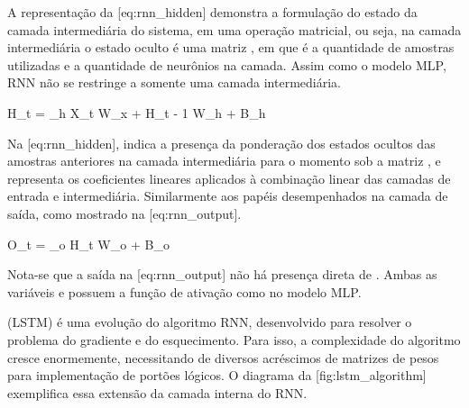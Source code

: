 			\startplacefigure[title={Demonstração da unidade fundamental das redes neurais recorrentes}, reference={fig:rnn_algorithm}]
			\stopplacefigure
		\stophead

		A representação da [eq:rnn_hidden] demonstra a formulação do estado da camada intermediária do sistema, em uma operação matricial, ou seja, na camada intermediária o estado oculto é uma matriz , em que  é a quantidade de amostras utilizadas e  a quantidade de neurônios na camada. Assim como o modelo MLP, RNN não se restringe a somente uma camada intermediária.

		\startplaceformula[reference={eq:rnn_hidden}]
			\startformula
				H_{t} = \sigma_{h} \left\lparen X_{t} W_{x} + H_{t - 1} W_{h} + B_{h} \right\rparen
			\stopformula
		\stopplaceformula

		Na [eq:rnn_hidden],  indica a presença da ponderação dos estados ocultos das amostras anteriores na camada intermediária para o momento  sob a matriz , e  representa os coeficientes lineares aplicados à combinação linear das camadas de entrada e intermediária. Similarmente aos papéis desempenhados na camada de saída, como mostrado na [eq:rnn_output].

		\startplaceformula[reference={eq:rnn_output}]
			\startformula
				O_{t} = \sigma_{o} \left\lparen H_{t} W_{o} + B_{o} \right\rparen
			\stopformula
		\stopplaceformula

		Nota-se que a saída  na [eq:rnn_output] não há presença direta de . Ambas as variáveis  e  possuem a função de ativação \math{\sigma} como no modelo MLP.

			 (LSTM) é uma evolução do algoritmo RNN, desenvolvido para resolver o problema do gradiente e do esquecimento. Para isso, a complexidade do algoritmo cresce enormemente, necessitando de diversos acréscimos de matrizes de pesos para implementação de portões lógicos. O diagrama da [fig:lstm_algorithm] exemplifica essa extensão da camada interna do RNN.

			\startplacefigure[title={Demostração da unidade fundamental do algoritmo LSTM}, reference={fig:lstm_algorithm}]
			\stopplacefigure

